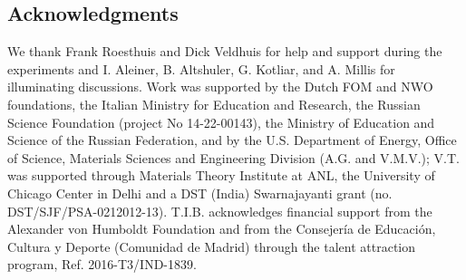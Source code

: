 \documentclass[aps,twocolumn,prl,10pt,amsmath,amssymb,nofootinbib,showpacs,superscriptaddress,floatfix]{revtex4-1}
\begin{document}
\subsection{Acknowledgments}
 We thank Frank Roesthuis and Dick Veldhuis for help
  and support during the experiments and I. Aleiner, B. Altshuler, G. Kotliar, and
  A. Millis for illuminating discussions. Work was supported by the Dutch FOM
  and NWO foundations, the Italian Ministry for Education and Research, the
  Russian Science Foundation (project No 14-22-00143), the Ministry of Education
  and Science of the Russian Federation, and by the U.S. Department
  of Energy, Office of Science, Materials Sciences and Engineering Division (A.G. and V.M.V.);
  V.T. was supported through Materials Theory Institute at ANL, the University
  of Chicago Center in Delhi and a DST (India) Swarnajayanti grant (no.
  DST/SJF/PSA-0212012-13). T.I.B. acknowledges financial support from the
  Alexander von Humboldt Foundation and from the Consejería de Educación, Cultura y Deporte (Comunidad de Madrid) through the talent attraction program, Ref. 2016-T3/IND-1839.
\end{document}
